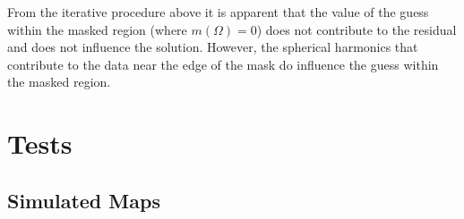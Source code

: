 \documentclass[useAMS,usenatbib]{mn2e}
\begin{document}
From the iterative procedure above it is apparent that the value of
the guess within the masked region (where $m(\Omega)=0$) does not
contribute to the residual and does not influence the solution.
However, the spherical harmonics that contribute to the data near the
edge of the mask do influence the guess within the masked region.


\section{Tests}
\label{sec:tests}


\subsection{Simulated Maps}
\label{sec:simulated-maps}
\end{document}
